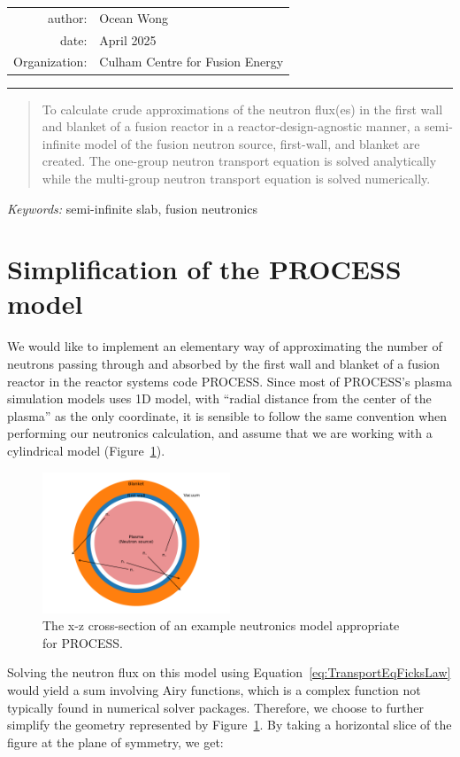 \documentclass[a4paper, 12pt]{article}
\begin{document}
    
\begin{table}[!h]
\centering
\begin{tabular}{rl}
author:&Ocean Wong          \\
date:  &April 2025       \\
Organization:&Culham Centre for Fusion Energy
\end{tabular}
\end{table}
\hrule
\begin{abstract}
    To calculate crude approximations of the neutron flux(es) in the first wall and blanket of a fusion reactor in a reactor-design-agnostic manner, a semi-infinite model of the fusion neutron source, first-wall, and blanket are created. The one-group neutron transport equation is solved analytically while the multi-group neutron transport equation is solved numerically.
\end{abstract}
\emph{Keywords:} semi-infinite slab, fusion neutronics

\section{Simplification of the PROCESS model}
We would like to implement an elementary way of approximating the number of neutrons passing through and absorbed by the first wall and blanket of a fusion reactor in the reactor systems code PROCESS. Since most of PROCESS's plasma simulation models uses 1D model, with ``radial distance from the center of the plasma'' as the only coordinate, it is sensible to follow the same convention when performing our neutronics calculation, and assume that we are working with a cylindrical model (Figure~\ref{fig:radial_plot}).
\begin{figure}[H]
\centering
\includegraphics[width=0.5\textwidth]{radial_plot.pdf}
\caption{The x-z cross-section of an example neutronics model appropriate for PROCESS.} \label{fig:radial_plot}
\end{figure}

Solving the neutron flux on this model using Equation~\ref{eq:TransportEqFicksLaw} would yield a sum involving Airy functions, which is a complex function not typically found in numerical solver packages.
Therefore, we choose to further simplify the geometry represented by Figure~\ref{fig:radial_plot}. By taking a horizontal slice of the figure at the plane of symmetry, we get:
\end{document}
